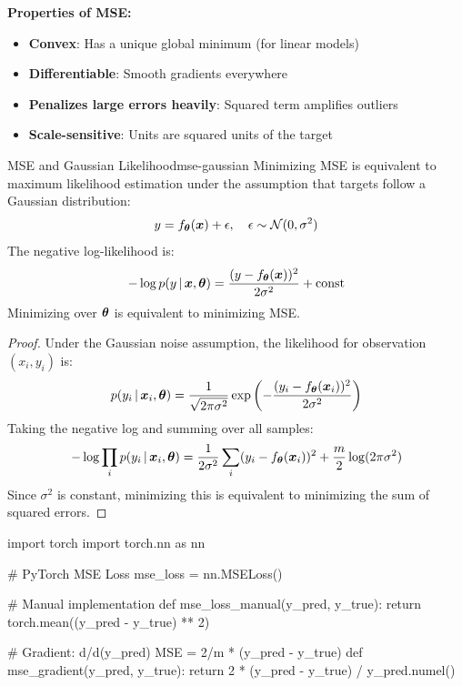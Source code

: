 \documentclass[../../main.tex]{subfiles}
\begin{document}
\textbf{Properties of MSE:}
\begin{itemize}
    \item \textbf{Convex}: Has a unique global minimum (for linear models)
    \item \textbf{Differentiable}: Smooth gradients everywhere
    \item \textbf{Penalizes large errors heavily}: Squared term amplifies outliers
    \item \textbf{Scale-sensitive}: Units are squared units of the target
\end{itemize}

\begin{theorem}{MSE and Gaussian Likelihood}{mse-gaussian}
Minimizing MSE is equivalent to maximum likelihood estimation under the assumption that targets follow a Gaussian distribution:
\[
    y = f_{\boldsymbol{\theta}}(\boldsymbol{x}) + \epsilon, \quad \epsilon \sim \mathcal{N}(0, \sigma^2)
\]
The negative log-likelihood is:
\[
    -\log p(y \,|\, \boldsymbol{x}, \boldsymbol{\theta}) = \frac{(y - f_{\boldsymbol{\theta}}(\boldsymbol{x}))^2}{2\sigma^2} + \text{const}
\]
Minimizing over $\boldsymbol{\theta}$ is equivalent to minimizing MSE.
\end{theorem}

\begin{proof}
Under the Gaussian noise assumption, the likelihood for observation $(x_i, y_i)$ is:
\[
    p(y_i \,|\, \boldsymbol{x}_i, \boldsymbol{\theta}) = \frac{1}{\sqrt{2\pi\sigma^2}} \exp\left(-\frac{(y_i - f_{\boldsymbol{\theta}}(\boldsymbol{x}_i))^2}{2\sigma^2}\right)
\]
Taking the negative log and summing over all samples:
\[
    -\log \prod_i p(y_i \,|\, \boldsymbol{x}_i, \boldsymbol{\theta}) = \frac{1}{2\sigma^2} \sum_i (y_i - f_{\boldsymbol{\theta}}(\boldsymbol{x}_i))^2 + \frac{m}{2}\log(2\pi\sigma^2)
\]
Since $\sigma^2$ is constant, minimizing this is equivalent to minimizing the sum of squared errors.
\end{proof}

\begin{pythoncode}
import torch
import torch.nn as nn

# PyTorch MSE Loss
mse_loss = nn.MSELoss()

# Manual implementation
def mse_loss_manual(y_pred, y_true):
    return torch.mean((y_pred - y_true) ** 2)

# Gradient: d/d(y_pred) MSE = 2/m * (y_pred - y_true)
def mse_gradient(y_pred, y_true):
    return 2 * (y_pred - y_true) / y_pred.numel()
\end{pythoncode}
\end{document}
